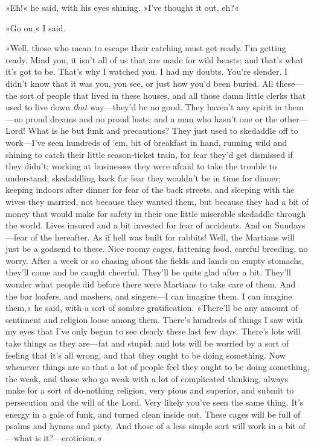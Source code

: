 »Eh!« he said, with his eyes shining. »I've thought it out, eh?«

»Go on,« I said.

»Well, those who mean to escape their catching must get ready. I'm getting ready. Mind you, it isn't all of us that are made for wild beasts; and that's what it's got to be. That's why I watched you. I had my doubts. You're slender. I didn't know that it was you, you see, or just how you'd been buried. All these—the sort of people that lived in these houses, and all those damn little clerks that used to live down \textit{that} way—they'd be no good. They haven't any spirit in them—no proud dreams and no proud lusts; and a man who hasn't one or the other—Lord! What is he but funk and precautions? They just used to skedaddle off to work—I've seen hundreds of 'em, bit of breakfast in hand, running wild and shining to catch their little season-ticket train, for fear they'd get dismissed if they didn't; working at businesses they were afraid to take the trouble to understand; skedaddling back for fear they wouldn't be in time for dinner; keeping indoors after dinner for fear of the back streets, and sleeping with the wives they married, not because they wanted them, but because they had a bit of money that would make for safety in their one little miserable skedaddle through the world. Lives insured and a bit invested for fear of accidents. And on Sundays—fear of the hereafter. As if hell was built for rabbits! Well, the Martians will just be a godsend to these. Nice roomy cages, fattening food, careful breeding, no worry. After a week or so chasing about the fields and lands on empty stomachs, they'll come and be caught cheerful. They'll be quite glad after a bit. They'll wonder what people did before there were Martians to take care of them. And the bar loafers, and mashers, and singers—I can imagine them. I can imagine them,« he said, with a sort of sombre gratification. »There'll be any amount of sentiment and religion loose among them. There's hundreds of things I saw with my eyes that I've only begun to see clearly these last few days. There's lots will take things as they are—fat and stupid; and lots will be worried by a sort of feeling that it's all wrong, and that they ought to be doing something. Now whenever things are so that a lot of people feel they ought to be doing something, the weak, and those who go weak with a lot of complicated thinking, always make for a sort of do-nothing religion, very pious and superior, and submit to persecution and the will of the Lord. Very likely you've seen the same thing. It's energy in a gale of funk, and turned clean inside out. These cages will be full of psalms and hymns and piety. And those of a less simple sort will work in a bit of—what is it?—eroticism.«

